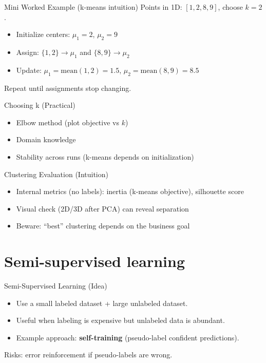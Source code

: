 \documentclass[aspectratio=169]{beamer}
\begin{document}
\begin{frame}{Mini Worked Example (k-means intuition)}
  Points in 1D: $[1,2,8,9]$, choose $k=2$.
  \begin{itemize}[<+->]
    \item Initialize centers: $\mu_1=2$, $\mu_2=9$
    \item Assign: $\{1,2\}\rightarrow \mu_1$ and $\{8,9\}\rightarrow \mu_2$
    \item Update: $\mu_1=\text{mean}(1,2)=1.5$, $\mu_2=\text{mean}(8,9)=8.5$
  \end{itemize}
  Repeat until assignments stop changing.
\end{frame}

\begin{frame}{Choosing k (Practical)}
  \begin{itemize}[<+->]
    \item Elbow method (plot objective vs $k$)
    \item Domain knowledge
    \item Stability across runs (k-means depends on initialization)
  \end{itemize}
\end{frame}

\begin{frame}{Clustering Evaluation (Intuition)}
  \begin{itemize}[<+->]
    \item Internal metrics (no labels): inertia (k-means objective), silhouette score
    \item Visual check (2D/3D after PCA) can reveal separation
    \item Beware: ``best'' clustering depends on the business goal
  \end{itemize}
\end{frame}

\section{Semi-supervised learning}
\label{sec:semi}

\begin{frame}{Semi-Supervised Learning (Idea)}
  \begin{itemize}[<+->]
    \item Use a small labeled dataset + large unlabeled dataset.
    \item Useful when labeling is expensive but unlabeled data is abundant.
    \item Example approach: \textbf{self-training} (pseudo-label confident predictions).
  \end{itemize}
  \vspace{0.4em}
  Risks: error reinforcement if pseudo-labels are wrong.
\end{frame}
\end{document}
